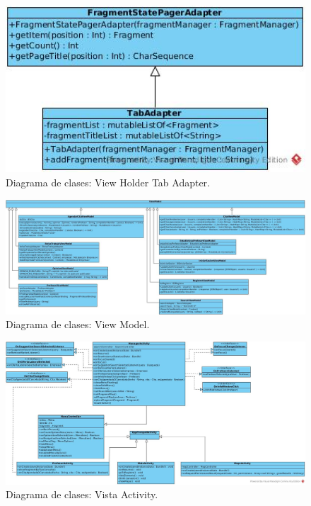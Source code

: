 \begin{figure}[!htpb]
	\hypertarget{fig:clasesViewHolderTabAdapter}{\hspace{1pt}}
	\begin{center}
		\includegraphics[width=1\textwidth]{images/clases/ViewHolderTabAdapter}
		\caption{Diagrama de clases: View Holder Tab Adapter.}
		\label{fig:clasesViewHolderTabAdapter}
	\end{center}
\end{figure}

\begin{figure}[!htpb]
	\hypertarget{fig:clasesViewModel}{\hspace{1pt}}
	\begin{center}
		\includegraphics[width=1\textwidth]{images/clases/ViewModel}
		\caption{Diagrama de clases: View Model.}
		\label{fig:clasesViewModel}
	\end{center}
\end{figure}

\begin{figure}[!htpb]
	\hypertarget{fig:clasesVistaAct}{\hspace{1pt}}
	\begin{center}
		\includegraphics[width=1\textwidth]{images/clases/VistaActivity}
		\caption{Diagrama de clases: Vista Activity.}
		\label{fig:clasesVistaAct}
	\end{center}
\end{figure}

